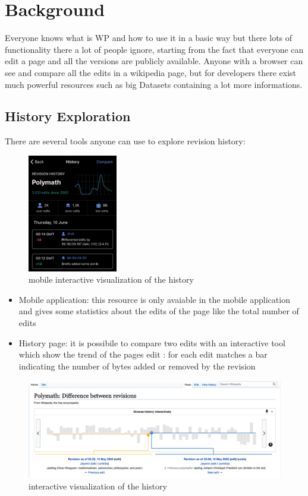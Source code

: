 \chapter{Background}
Everyone knows what is WP and how to use it in a basic way but there lots of functionality
there a lot of people ignore, starting from the fact that everyone can edit a page and all the
versions are publicly available. Anyone with a browser can see and compare all the edits in a
wikipedia page, but for developers there exist much powerful resources such as big Datasets 
containing a lot more informations.  

\section{History Exploration}
There are several tools anyone can use to explore revision history: 
\begin{figure}[h]
    \centering
    \includegraphics[width=0.35\textwidth]{./chapters/02/assets/mobile_history.jpg}
    \caption{mobile interactive visualization of the history}
    \label{fig:mobilehistory}
\end{figure}

\begin{itemize}
    \item Mobile application: this resource is only avaiable in the mobile application and gives
        some statistics about the edits of the page like the total number of edits 
    \item History page: it is possibile to compare two edits with an interactive tool which show the
        trend of the pages edit : for each edit matches a bar indicating the number of bytes added or
        removed by the revision 
\end{itemize}



\begin{figure}[h]
    \centering
    \includegraphics[width=1\textwidth]{./chapters/02/assets/history.png}
    \caption{interactive visualization of the history}
    \label{fig:history}
\end{figure}


